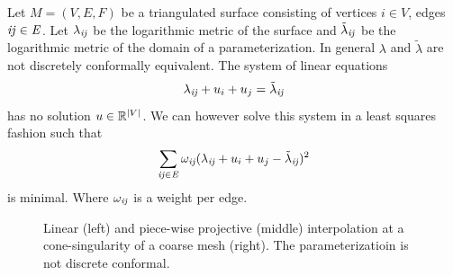 Let $M=(V, E, F)$ be a triangulated surface consisting of vertices $i\in V$, edges $\it{ij}\in E$. 
Let $\lambda_{\it{ij}}$ be the logarithmic metric of the surface and $\tilde{\lambda}_{\it{ij}}$
be the logarithmic metric of the domain of a parameterization. In general $\lambda$ and 
$\tilde{\lambda}$ are not discretely conformally equivalent. The system of linear equations
\begin{equation}
	\lambda_{\it{ij}} + u_i + u_j = \tilde{\lambda}_{\it{ij}}
\end{equation}
has no solution $u\in \mathbb R^{|V|}$. 
We can however solve this system in a least squares fashion such that 
\[\sum_{\it{ij} \in E} \omega_{\it{ij}}(\lambda_{\it{ij}} + u_i + u_j - \tilde{\lambda}_{\it{ij}})^2 \]
is minimal. Where $\omega_{\it{ij}}$ is a weight per edge.

\begin{figure}
\centering
{}
\caption{Linear (left) and piece-wise projective (middle) interpolation 
at a cone-singularity of a coarse mesh (right). The parameterizatioin is not discrete conformal.}
\label{fig:linear_projective} 
\end{figure}


